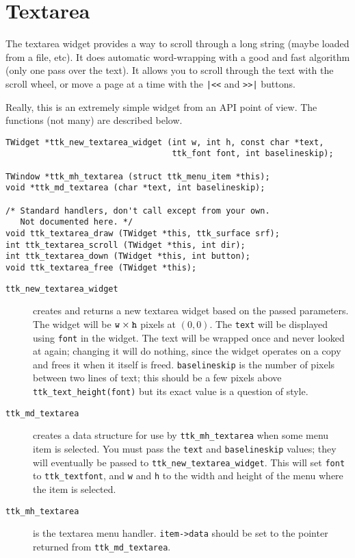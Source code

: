 \documentclass[12pt,letterpaper]{report}
\let\ttt\tt
\def\tt{\def\_{{\ttt\char`\_}}\ttt}
\begin{document}
\section{Textarea}
The textarea widget provides a way to scroll through a long string (maybe loaded from a file, etc).
It does automatic word-wrapping with a good and fast algorithm (only one pass over the text).
It allows you to scroll through the text with the scroll wheel, or move a page at a time with the \verb:|<<:
and \verb:>>|: buttons.

Really, this is an extremely simple widget from an API point of view. The functions (not many) are
described below.

\begin{verbatim}
TWidget *ttk_new_textarea_widget (int w, int h, const char *text,
                                  ttk_font font, int baselineskip);

TWindow *ttk_mh_textarea (struct ttk_menu_item *this);
void *ttk_md_textarea (char *text, int baselineskip);

/* Standard handlers, don't call except from your own.
   Not documented here. */
void ttk_textarea_draw (TWidget *this, ttk_surface srf);
int ttk_textarea_scroll (TWidget *this, int dir);
int ttk_textarea_down (TWidget *this, int button);
void ttk_textarea_free (TWidget *this);
\end{verbatim}

\begin{description}
\item[{\tt ttk_new_textarea_widget}] creates and returns a new textarea widget based on the passed
parameters. The widget will be $\verb|w| \times \verb|h|$ pixels at $(0,0)$. The \verb|text| will
be displayed using \verb|font| in the widget. The text will be wrapped once and never looked at
again; changing it will do nothing, since the widget operates on a copy and frees it when it itself
is freed. \verb|baselineskip| is the number of pixels between two lines of text; this should be
a few pixels above \verb|ttk_text_height(font)| but its exact value is a question of style.
\item[{\tt ttk_md_textarea}] creates a data structure for use by \verb|ttk_mh_textarea| when
some menu item is selected. You must pass the \verb|text| and \verb|baselineskip| values; they
will eventually be passed to \verb|ttk_new_textarea_widget|. This will set \verb|font| to \verb|ttk_textfont|,
and \verb|w| and \verb|h| to the width and height of the menu where the item is selected.
\item[{\tt ttk_mh_textarea}] is the textarea menu handler. \verb|item->data| should be set to
the pointer returned from \verb|ttk_md_textarea|.
\end{description}
\end{document}
